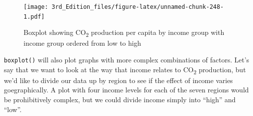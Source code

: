 \documentclass[
]{book}
\newenvironment{Shaded}{\begin{snugshade}}{\end{snugshade}}
\newcommand{\DataTypeTok}[1]{\textcolor[rgb]{0.13,0.29,0.53}{#1}}
\newcommand{\DecValTok}[1]{\textcolor[rgb]{0.00,0.00,0.81}{#1}}
\newcommand{\FloatTok}[1]{\textcolor[rgb]{0.00,0.00,0.81}{#1}}
\newcommand{\KeywordTok}[1]{\textcolor[rgb]{0.13,0.29,0.53}{\textbf{#1}}}
\newcommand{\NormalTok}[1]{#1}
\newcommand{\OperatorTok}[1]{\textcolor[rgb]{0.81,0.36,0.00}{\textbf{#1}}}
\newcommand{\StringTok}[1]{\textcolor[rgb]{0.31,0.60,0.02}{#1}}
\begin{document}
\begin{Shaded}
\end{Shaded}

\begin{figure}
\centering
\texttt{[image: 3rd\_Edition\_files/figure-latex/unnamed-chunk-248-1.pdf]}
\caption{\label{fig:unnamed-chunk-248}Boxplot showing CO\textsubscript{2} production per capita by income group with income group ordered from low to high}
\end{figure}

\texttt{boxplot()} will also plot graphs with more complex combinations of factors. Let's say that we want to look at the way that income relates to CO\textsubscript{2} production, but we'd like to divide our data up by region to see if the effect of income varies goegraphically. A plot with four income levels for each of the seven regions would be prohibitively complex, but we could divide income simply into ``high'' and ``low''.

\begin{Shaded}
\end{Shaded}
\end{document}
